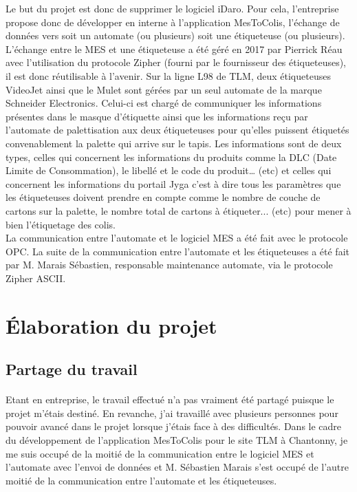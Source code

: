 \documentclass[a4paper,12pt]{extarticle}
\begin{document}
	
	Le but du projet est donc de supprimer le logiciel iDaro. Pour cela, l’entreprise propose donc de développer en interne à l’application MesToColis, l’échange de données vers soit un automate (ou plusieurs) soit une étiqueteuse (ou plusieurs). L’échange entre le MES et une étiqueteuse a été géré en 2017 par Pierrick Réau avec l’utilisation du protocole Zipher (fourni par le fournisseur des étiqueteuses), il est donc réutilisable à l’avenir. Sur la ligne L98 de TLM, deux étiqueteuses VideoJet ainsi que le Mulet sont gérées par un seul automate de la marque Schneider Electronics. Celui-ci est chargé de communiquer les informations présentes dans le masque d’étiquette ainsi que les informations reçu par l’automate de palettisation aux deux étiqueteuses pour qu’elles puissent étiquetés convenablement la palette qui arrive sur le tapis. Les informations sont de deux types, celles qui concernent les informations du produits comme la DLC (Date Limite de Consommation), le libellé et le code du produit… (etc) et celles qui concernent les informations du portail Jyga c’est à dire tous les paramètres que les étiqueteuses doivent prendre en compte comme le nombre de couche de cartons sur la palette, le nombre total de cartons à étiqueter... (etc) pour mener à bien l’étiquetage des colis.\\
La communication entre l’automate et le logiciel MES a été fait avec le protocole OPC. La suite de la communication entre l’automate et les étiqueteuses a été fait par M. Marais Sébastien, responsable maintenance automate, via le protocole Zipher ASCII.\\

	\clearpage
	
	\section{Élaboration du projet}
	
	\subsection{Partage du travail}
		\paragraph{}
			
	Etant en entreprise, le travail effectué n’a pas vraiment été partagé puisque le projet m’étais destiné. En revanche, j’ai travaillé avec plusieurs personnes pour pouvoir avancé dans le projet lorsque j’étais face à des difficultés. Dans le cadre du développement de l’application MesToColis pour le site TLM à Chantonny, je me suis occupé de la moitié de la communication entre le logiciel MES et l’automate avec l’envoi de données et M. Sébastien Marais s’est occupé de l’autre moitié de la communication entre l’automate et les étiqueteuses.\\
	
\end{document}
